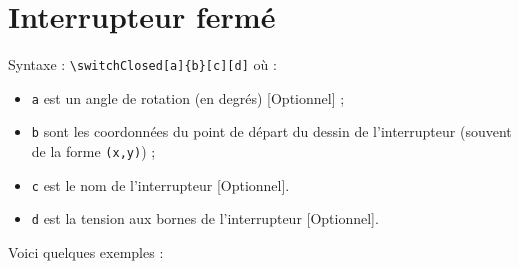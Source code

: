 \documentclass[a4paper,12pt]{article}
\begin{document}
	\section{Interrupteur fermé}
	
	Syntaxe : \verb!\switchClosed[a]{b}[c][d]! où :
	\begin{itemize}
		\item \verb!a! est un angle de rotation (en degrés) [Optionnel] ;
		\item \verb!b! sont les coordonnées du point de départ du dessin de l'interrupteur (souvent de la forme \verb!(x,y)!) ;
		\item \verb!c! est le nom de l'interrupteur [Optionnel].
		\item \verb!d! est la tension aux bornes de l'interrupteur [Optionnel].
	\end{itemize}
	
	Voici quelques exemples :
\end{document}
